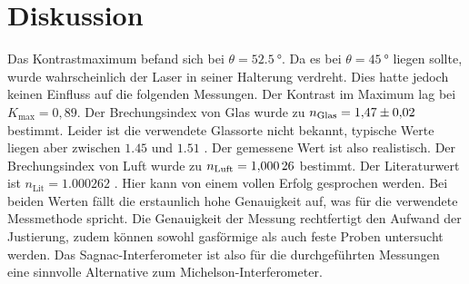 \section{Diskussion}
Das Kontrastmaximum befand sich bei $\theta = \SI{52.5}{°}$. Da es bei $\theta = \SI{45}{°}$ liegen sollte, wurde wahrscheinlich der Laser in seiner Halterung verdreht. Dies hatte jedoch keinen Einfluss auf die folgenden Messungen. Der Kontrast im Maximum lag bei $K_\text{max} = 0,89$.
Der Brechungsindex von Glas wurde zu
$n_\text{Glas}=\num{1,47 \pm 0,02}$
bestimmt.
Leider ist die verwendete Glassorte nicht bekannt,
typische Werte liegen aber zwischen $\num{1,45}$ und
 $\num{1,51}$ \cite{filmetrics}. Der gemessene Wert ist also realistisch.
Der Brechungsindex von Luft wurde zu $n_\text{Luft}=\num{1,00026 \pm 0,00000}$ bestimmt. Der Literaturwert ist $n_\text{Lit}=\num{1,000262}$ \cite{spektrum}. Hier kann von
einem vollen Erfolg gesprochen werden. Bei beiden Werten fällt die erstaunlich hohe Genauigkeit auf, was für die verwendete Messmethode spricht. Die Genauigkeit der Messung rechtfertigt den Aufwand der Justierung, zudem können sowohl gasförmige als auch feste Proben untersucht werden. Das Sagnac-Interferometer ist also für die durchgeführten Messungen eine sinnvolle Alternative zum Michelson-Interferometer.
\label{sec:Diskussion}
